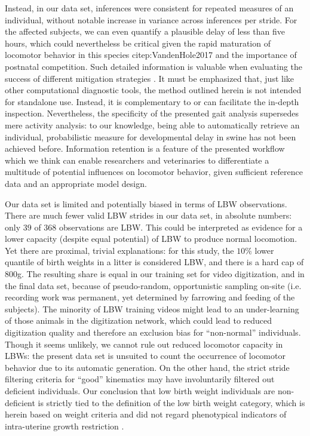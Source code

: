 Instead, in our data set, inferences were consistent for repeated measures of an individual, without notable increase in variance across inferences per stride.
For the affected subjects, we can even quantify a plausible delay of less than five hours, which could nevertheless be critical given the rapid maturation of locomotor behavior in this species citep:VandenHole2017 and the importance of postnatal competition.
Such detailed information is valuable when evaluating the success of different mitigation strategies \citep[e.g. supplementing energy to piglets,][]{Schmitt2019}.
It must be emphasized that, just like other computational diagnostic tools, the method outlined herein is not intended for standalone use.
Instead, it is complementary to or can facilitate the in-depth inspection.
Nevertheless, the specificity of the presented gait analysis supersedes mere activity analysis: to our knowledge, being able to automatically retrieve an individual, probabilistic measure for developmental delay in swine has not been achieved before.
Information retention is a feature of the presented workflow which we think can enable researchers and veterinaries to differentiate a multitude of potential influences on locomotor behavior, given sufficient reference data and an appropriate model design.


\bigskip
Our data set is limited and potentially biased in terms of LBW observations.
There are much fewer valid LBW strides in our data set, in absolute numbers: only
\(39\)
of
\(368\)
observations are LBW.
This could be interpreted as evidence for a lower capacity (despite equal potential) of LBW to produce normal locomotion.
Yet there are proximal, trivial explanations: for this study, the \(10 \%\) lower quantile of birth weights in a litter is considered LBW, and there is a hard cap of \(800\)g.
The resulting share is equal in our training set for video digitization, and in the final data set, because of pseudo-random, opportunistic sampling on-site (i.e. recording work was permanent, yet determined by farrowing and feeding of the subjects).
The minority of LBW training videos might lead to an under-learning of those animals in the digitization network, which could lead to reduced digitization quality and therefore an exclusion bias for ``non-normal'' individuals.
Though it seems unlikely, we cannot rule out reduced locomotor capacity in LBWs: the present data set is unsuited to count the occurrence of locomotor behavior due to its automatic generation.
On the other hand, the strict stride filtering criteria for ``good'' kinematics may have involuntarily filtered out deficient individuals.
Our conclusion that low birth weight individuals are non-deficient is strictly tied to the definition of the low birth weight category, which is herein based on weight criteria and did not regard phenotypical indicators of intra-uterine growth restriction \citep[which we did not record, \textit{cf.}][]{Amdi2013}.


